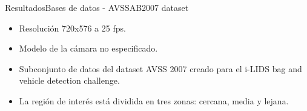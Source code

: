 
\begin{frame}{Resultados}{Bases de datos - AVSSAB2007 dataset}

\begin{itemize}
    \justifying
    \item Resolución 720x576 a 25 fps.
    \item Modelo de la cámara no especificado.
    \item Subconjunto de datos del dataset AVSS 2007 creado para el i-LIDS bag and vehicle detection challenge.
    \item La región de interés está dividida en tres zonas: cercana, media y lejana.
\end{itemize}

\vspace{0.1cm}


\end{frame}
